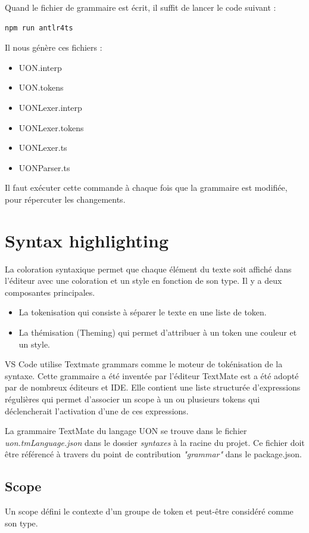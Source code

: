 \documentclass[
    iict, %
    il, %
]{heig-tb}
\begin{document}
Quand le fichier de grammaire est écrit, il suffit de lancer le code suivant :

\begin{lstlisting}[frame=single]
    npm run antlr4ts
\end{lstlisting}

Il nous génère ces fichiers :
\begin{itemize}
    \item UON.interp
    \item UON.tokens
    \item UONLexer.interp
    \item UONLexer.tokens
    \item UONLexer.ts
    \item UONParser.ts
\end{itemize}

Il faut exécuter cette commande à chaque fois que la grammaire est modifiée, pour répercuter les changements.

\section{Syntax highlighting}

La coloration syntaxique permet que chaque élément du texte soit affiché dans l'éditeur avec une coloration et un style en fonction de son type.
Il y a deux composantes principales.
\begin{itemize}
    \item La tokenisation qui consiste à séparer le texte en une liste de token.
    \item La thémisation (Theming) qui permet d'attribuer à un token une couleur et un style.
\end{itemize}

VS Code utilise Textmate grammars comme le moteur de tokénisation de la syntaxe.
Cette grammaire a été inventée par l'éditeur TextMate est a été adopté par de nombreux éditeurs et IDE.
Elle contient une liste structurée d'expressions régulières qui permet d'associer un scope
à un ou plusieurs tokens qui déclencherait l'activation d'une de ces expressions. \cite{syntax-highlight-guide}

La grammaire TextMate du langage UON se trouve dans le fichier \emph{uon.tmLanguage.json} dans le dossier \emph{syntaxes} à la racine du projet.
Ce fichier doit être référencé à travers du point de contribution \emph{"grammar"} dans le package.json.

\subsection{Scope}
Un scope défini le contexte d'un groupe de token et peut-être considéré comme son type.
\end{document}
